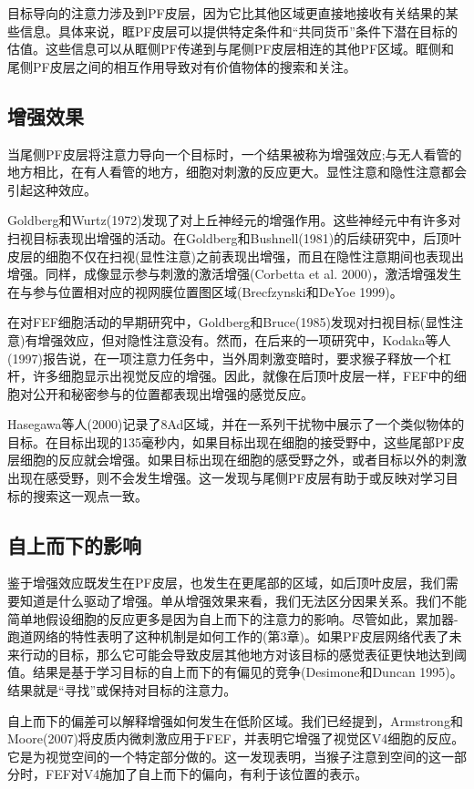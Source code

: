 目标导向的注意力涉及到PF皮层，因为它比其他区域更直接地接收有关结果的某些信息。具体来说，眶PF皮层可以提供特定条件和“共同货币”条件下潜在目标的估值。这些信息可以从眶侧PF传递到与尾侧PF皮层相连的其他PF区域。眶侧和尾侧PF皮层之间的相互作用导致对有价值物体的搜索和关注。

\subsection{增强效果}
当尾侧PF皮层将注意力导向一个目标时，一个结果被称为增强效应;与无人看管的地方相比，在有人看管的地方，细胞对刺激的反应更大。显性注意和隐性注意都会引起这种效应。

Goldberg和Wurtz(1972)发现了对上丘神经元的增强作用。这些神经元中有许多对扫视目标表现出增强的活动。在Goldberg和Bushnell(1981)的后续研究中，后顶叶皮层的细胞不仅在扫视(显性注意)之前表现出增强，而且在隐性注意期间也表现出增强。同样，成像显示参与刺激的激活增强(Corbetta et al. 2000)，激活增强发生在与参与位置相对应的视网膜位置图区域(Brecfzynski和DeYoe 1999)。

在对FEF细胞活动的早期研究中，Goldberg和Bruce(1985)发现对扫视目标(显性注意)有增强效应，但对隐性注意没有。然而，在后来的一项研究中，Kodaka等人(1997)报告说，在一项注意力任务中，当外周刺激变暗时，要求猴子释放一个杠杆，许多细胞显示出视觉反应的增强。因此，就像在后顶叶皮层一样，FEF中的细胞对公开和秘密参与的位置都表现出增强的感觉反应。

Hasegawa等人(2000)记录了8Ad区域，并在一系列干扰物中展示了一个类似物体的目标。在目标出现的135毫秒内，如果目标出现在细胞的接受野中，这些尾部PF皮层细胞的反应就会增强。如果目标出现在细胞的感受野之外，或者目标以外的刺激出现在感受野，则不会发生增强。这一发现与尾侧PF皮层有助于或反映对学习目标的搜索这一观点一致。
\subsection{自上而下的影响}
鉴于增强效应既发生在PF皮层，也发生在更尾部的区域，如后顶叶皮层，我们需要知道是什么驱动了增强。单从增强效果来看，我们无法区分因果关系。我们不能简单地假设细胞的反应更多是因为自上而下的注意力的影响。尽管如此，累加器-跑道网络的特性表明了这种机制是如何工作的(第3章)。如果PF皮层网络代表了未来行动的目标，那么它可能会导致皮层其他地方对该目标的感觉表征更快地达到阈值。结果是基于学习目标的自上而下的有偏见的竞争(Desimone和Duncan 1995)。结果就是“寻找”或保持对目标的注意力。

自上而下的偏差可以解释增强如何发生在低阶区域。我们已经提到，Armstrong和Moore(2007)将皮质内微刺激应用于FEF，并表明它增强了视觉区V4细胞的反应。它是为视觉空间的一个特定部分做的。这一发现表明，当猴子注意到空间的这一部分时，FEF对V4施加了自上而下的偏向，有利于该位置的表示。

